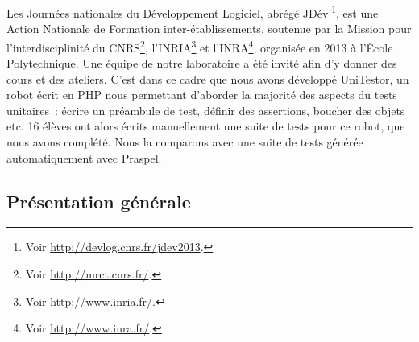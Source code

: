 Les Journées nationales du Développement Logiciel, abrégé JDév'\footnote{Voir
\url{http://devlog.cnrs.fr/jdev2013}.}, est une Action Nationale de Formation
inter-établissements, soutenue par la Mission pour l'interdisciplinité du
CNRS\footnote{Voir \url{http://mrct.cnrs.fr/}.}, l'INRIA\footnote{Voir
\url{http://www.inria.fr/}.} et l'INRA\footnote{Voir
\url{http://www.inra.fr/}.}, organisée en 2013 à l'École Polytechnique. Une
équipe de notre laboratoire a été invité afin d'y donner des cours et des
ateliers. C'est dans ce cadre que nous avons développé UniTestor, un robot écrit
en PHP nous permettant d'aborder la majorité des aspects du tests unitaires~:
écrire un préambule de test, définir des assertions, boucher des objets etc. 16
élèves ont alors écrits manuellement une suite de tests pour ce robot, que nous
avons complété. Nous la comparons avec une suite de tests générée
automatiquement avec Praspel.

\subsection{Présentation générale}

